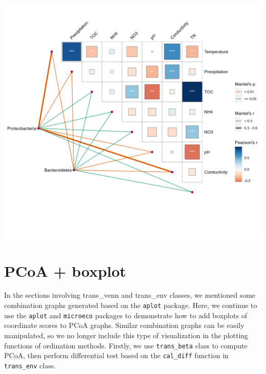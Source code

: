 \documentclass[
]{book}
\begin{document}
\begin{center}\includegraphics[width=650px]{Images/plot_env_mantel_ggcor} \end{center}

\hypertarget{pcoa-boxplot}{%
\section{PCoA + boxplot}\label{pcoa-boxplot}}

In the sections involving trans\_venn and trans\_env classes,
we mentioned some combination graphs generated based on the \texttt{aplot} package.
Here, we continue to use the \texttt{aplot} and \texttt{microeco} packages to demonstrate how to add boxplots of coordinate scores to PCoA graphs.
Similar combination graphs can be easily manipulated, so we no longer include this type of visualization in the plotting functions of ordination methods.
Firstly, we use \texttt{trans\_beta} class to compute PCoA, then perform differential test based on the \texttt{cal\_diff} function in \texttt{trans\_env} class.
\end{document}

